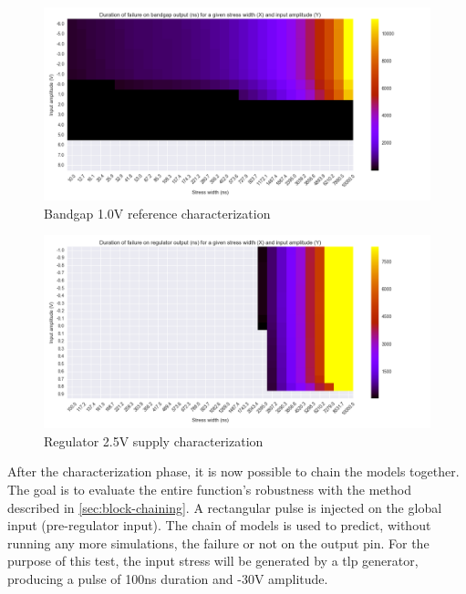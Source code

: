 \begin{figure}[!h]
  \centering
  \includegraphics[width=\textwidth]{src/4/figures/bandgap_cz.png}
  \caption{Bandgap 1.0V reference characterization}
  \label{bandgap_wb}
\end{figure}

\begin{figure}[!h]
  \centering
  \includegraphics[width=\textwidth]{src/4/figures/regulator_cz.png}
  \caption{Regulator 2.5V supply characterization}
  \label{regu_wb}
\end{figure}

After the characterization phase, it is now possible to chain the models together.
The goal is to evaluate the entire function's robustness with the method described in \ref{sec:block-chaining}.
A rectangular pulse is injected on the global input (pre-regulator input).
The chain of models is used to predict, without running any more simulations, the failure or not on the output pin.
For the purpose of this test, the input stress will be generated by a \gls{tlp} generator, producing a pulse of 100ns duration and -30V amplitude.


